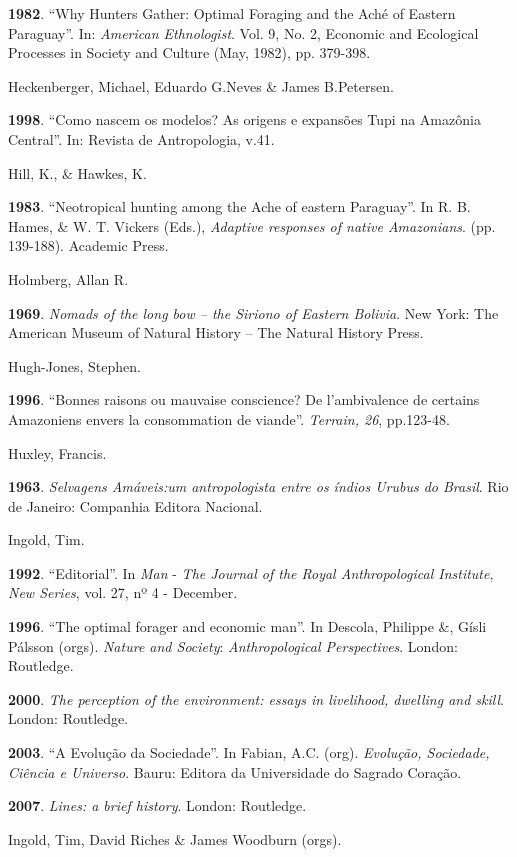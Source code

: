 \textbf{1982}. ``Why Hunters Gather: Optimal Foraging and the Aché of
Eastern Paraguay''. In: \emph{American Ethnologist}. Vol. 9, No. 2,
Economic and Ecological Processes in Society and Culture (May, 1982),
pp. 379-398.

Heckenberger, Michael, Eduardo G.Neves \& James B.Petersen.

\textbf{1998}. ``Como nascem os modelos? As origens e expansões Tupi na
Amazônia Central''. In: Revista de Antropologia, v.41.

Hill, K., \& Hawkes, K.

\textbf{1983}. ``Neotropical hunting among the Ache of eastern
Paraguay''. In R. B. Hames, \& W. T. Vickers (Eds.), \emph{Adaptive
responses of native Amazonians}. (pp. 139-188). Academic Press.

Holmberg, Allan R.

\textbf{1969}. \emph{Nomads of the long bow -- the Siriono of Eastern
Bolivia}. New York: The American Museum of Natural History -- The
Natural History Press.

Hugh-Jones, Stephen.

\textbf{1996}. ``Bonnes raisons ou mauvaise conscience? De l'ambivalence
de certains Amazoniens envers la consommation de viande''. \emph{Terrain,
26}, pp.123-48.

Huxley, Francis.

\textbf{1963}. \emph{Selvagens Amáveis:um antropologista entre os índios
Urubus do Brasil}. Rio de Janeiro: Companhia Editora Nacional.

Ingold, Tim.

\textbf{1992}. ``Editorial''. In \emph{Man} - \emph{The Journal of the
Royal Anthropological Institute}, \emph{New Series}, vol. 27, nº 4 -
December.

\textbf{1996}. ``The optimal forager and economic man''. In Descola,
Philippe \&, Gísli Pálsson (orgs). \emph{Nature and Society}:
\emph{Anthropological Perspectives}. London: Routledge.

\textbf{2000}. \emph{The perception of the environment: essays in
livelihood, dwelling and skill}. London: Routledge.

\textbf{2003}. ``A Evolução da Sociedade''. In Fabian, A.C. (org).
\emph{Evolução, Sociedade, Ciência e Universo}. Bauru: Editora da
Universidade do Sagrado Coração.

\textbf{2007}. \emph{Lines: a brief history}. London: Routledge.

Ingold, Tim, David Riches \& James Woodburn (orgs).

